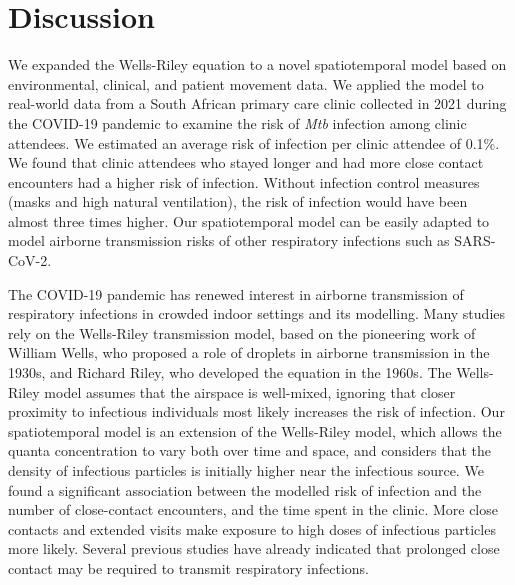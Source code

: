 \documentclass[fleqn,11pt]{wlscirep}
\begin{document}
\FloatBarrier

\newpage

\section*{Discussion}

We expanded the Wells-Riley equation to a novel spatiotemporal model based on environmental, clinical, and patient movement data. We applied the model to real-world data from a South African primary care clinic collected in 2021 during the COVID-19 pandemic to examine the risk of \emph{Mtb} infection among clinic attendees. We estimated an average risk of infection per clinic attendee of 0.1\%. We found that clinic attendees who stayed longer and had more close contact encounters had a higher risk of infection. Without infection control measures (masks and high natural ventilation), the risk of infection would have been almost three times higher. Our spatiotemporal model can be easily adapted to model airborne transmission risks of other respiratory infections such as SARS-CoV-2.

The COVID-19 pandemic has renewed interest in airborne transmission of respiratory infections in crowded indoor settings\cite{Wang2021Science,Morawska2021,Greenhalgh2022BMJ} and its modelling\cite{Shen2021STBE,Buonanno2020EI,Edwards2024RiskAnalysis}. Many studies\cite{Andrews2014JID,Taylor2016IJTLD,Hella2017JInfect,Zemouri2020JDR} rely on the Wells-Riley transmission model\cite{Riley1961Book}, based on the pioneering work of William Wells, who proposed a role of droplets in airborne transmission in the 1930s\cite{Wells1934AJE}, and Richard Riley, who developed the equation in the 1960s\cite{Riley1961Book}.  The Wells-Riley model assumes that the airspace is well-mixed, ignoring that closer proximity to infectious individuals most likely increases the risk of infection. Our spatiotemporal model is an extension of the Wells-Riley model, which allows the quanta concentration to vary both over time and space, and considers that the density of infectious particles is initially higher near the infectious source\cite{Wang2021Science,Vuorinen2020SafSci,Chen2020BuildEnv}. We found a significant association between the modelled risk of infection and the number of close-contact encounters, and the time spent in the clinic. More close contacts and extended visits make exposure to high doses of infectious particles more likely. Several previous studies have already indicated that prolonged close contact may be required to transmit respiratory infections\cite{Leung2020NatMed,Brankston2007LancetID,Narasimhan2013PulmonaryMed}. 
\end{document}
